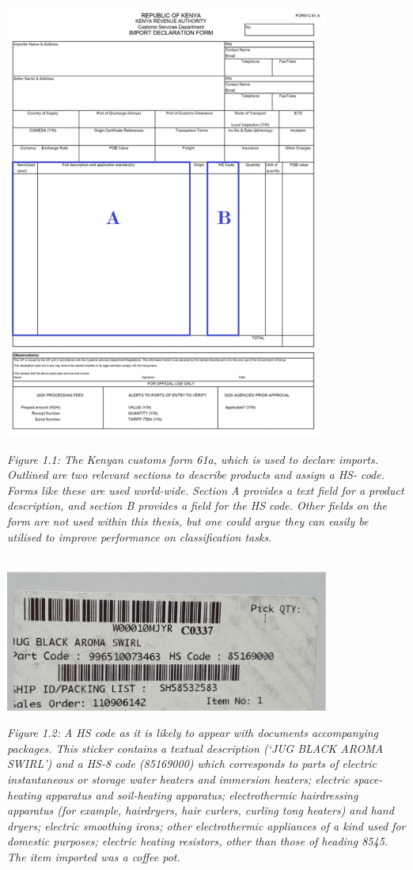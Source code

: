 \begin{center}
    \includegraphics[width=0.8\textwidth]{kenya.png}
\end{center}
{\textit{Figure 1.1: The Kenyan customs form 61a, which is used to declare imports. Outlined are two relevant sections to describe products and assign a HS- code. Forms like these are used world-wide. Section A provides a text field for a product description, and section B provides a field for the HS code. Other fields on the form are not used within this thesis, but one could argue they can easily be utilised to improve performance on classification tasks.}}
\\
\\
\begin{center}
    \includegraphics[width=0.8\textwidth]{sticker.png}
\end{center}
{\textit{Figure 1.2: A HS code as it is likely to appear with documents accompanying packages. This sticker contains a textual description (‘JUG BLACK AROMA SWIRL’) and a HS-8 code (85169000) which corresponds to parts of electric instantaneous or storage water heaters and immersion heaters; electric space-heating apparatus and soil-heating apparatus; electrothermic hairdressing apparatus (for example, hairdryers, hair curlers, curling tong heaters) and hand dryers; electric smoothing irons; other electrothermic appliances of a kind used for domestic purposes; electric heating resistors, other than those of heading 8545. The item imported was a coffee pot.}}
